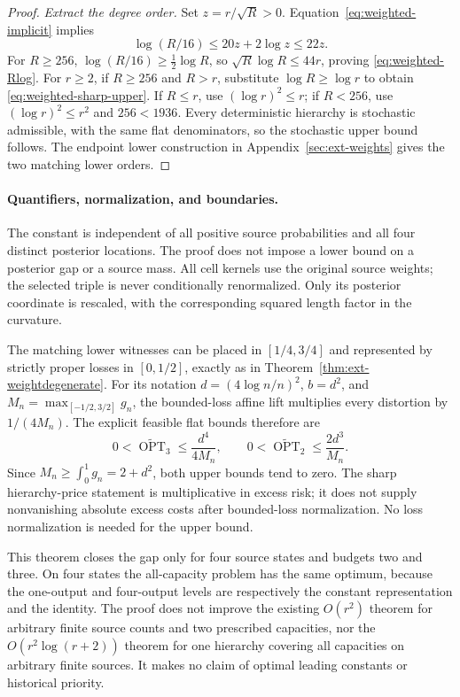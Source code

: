 \begin{proof}
\emph{Extract the degree order.}
Set $z=r/\sqrt R>0$. Equation~\eqref{eq:weighted-implicit} implies
\[
 \log(R/16)\le20z+2\log z\le22z.
\]
For $R\ge256$, $\log(R/16)\ge\tfrac12\log R$, so
$\sqrt R\log R\le44r$, proving \eqref{eq:weighted-Rlog}.
For $r\ge2$, if $R\ge256$ and $R>r$, substitute
$\log R\ge\log r$ to obtain \eqref{eq:weighted-sharp-upper}.
If $R\le r$, use $(\log r)^2\le r$; if $R<256$, use
$(\log r)^2\le r^2$ and $256<1936$.
Every deterministic hierarchy is stochastic admissible, with the same flat
denominators, so the stochastic upper bound follows. The endpoint lower construction in Appendix~\ref{sec:ext-weights} gives the two matching lower orders.
\end{proof}

\paragraph{Quantifiers, normalization, and boundaries.}
The constant is independent of all positive source probabilities and all
four distinct posterior locations. The proof does not impose a lower bound
on a posterior gap or a source mass. All cell kernels use the original
source weights; the selected triple is never conditionally renormalized.
Only its posterior coordinate is rescaled, with the corresponding squared
length factor in the curvature.

The matching lower witnesses can be placed in $[1/4,3/4]$ and represented
by strictly proper losses in $[0,1/2]$, exactly as in
Theorem~\ref{thm:ext-weightdegenerate}. For its notation
$d=(4\log n/n)^2$, $b=d^2$, and
$M_n=\max_{[-1/2,3/2]}g_n$, the bounded-loss affine lift multiplies every
distortion by $1/(4M_n)$. The explicit feasible flat bounds therefore are
\[
 0<\widetilde{\operatorname{OPT}}_3
 \le\frac{d^4}{4M_n},\qquad
 0<\widetilde{\operatorname{OPT}}_2
 \le\frac{2d^3}{M_n}.
\]
Since $M_n\ge\int_0^1g_n=2+d^2$, both upper bounds tend to zero.
The sharp hierarchy-price statement is multiplicative in excess risk;
it does not supply nonvanishing absolute excess costs after bounded-loss
normalization. No loss normalization is needed for the upper bound.

This theorem closes the gap only for four source states and budgets two
and three. On four states the all-capacity problem has the same optimum,
because the one-output and four-output levels are respectively the constant
representation and the identity. The proof does not improve the existing
$O(r^2)$ theorem for arbitrary finite source counts and two prescribed
capacities, nor the $O(r^2\log(r+2))$ theorem for one hierarchy covering all
capacities on arbitrary finite sources. It makes no claim of optimal
leading constants or historical priority.
